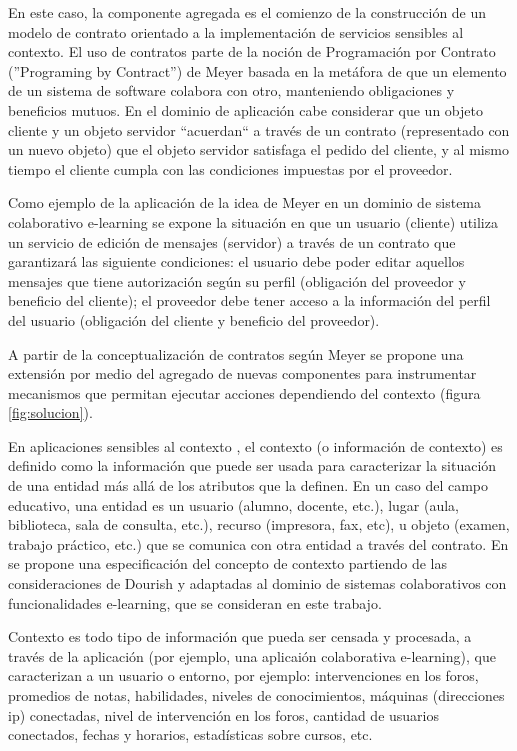 {En este caso, la componente agregada es el comienzo de la
construcción de un modelo de contrato orientado a la implementación de servicios
sensibles al contexto. El uso de contratos parte de la noción de Programación
por Contrato (”Programing by Contract”) de Meyer \cite{cap1.11} basada en la
metáfora de que un elemento de un sistema de software colabora con otro,
manteniendo obligaciones y beneficios mutuos. En el dominio de aplicación cabe
considerar que un objeto cliente y un objeto servidor “acuerdan“ a través de
un contrato (representado con un nuevo objeto) que el objeto servidor satisfaga
el pedido del cliente, y al mismo tiempo el cliente cumpla con las condiciones
impuestas por el proveedor.

Como ejemplo de la aplicación de la idea de Meyer en un dominio de
sistema colaborativo e-learning se expone la situación en que un
usuario (cliente) utiliza un servicio de edición de mensajes (servidor) a través
de un contrato que garantizará las siguiente condiciones: el usuario debe poder
editar aquellos mensajes que tiene autorización según su perfil (obligación del
proveedor y beneficio del cliente); el proveedor debe tener acceso a la
información del perfil del usuario (obligación del cliente y beneficio del
proveedor).

A partir de la conceptualización de contratos según Meyer se propone una
extensión por medio del agregado de nuevas componentes para instrumentar
mecanismos que permitan ejecutar acciones dependiendo del contexto (figura
\ref{fig:solucion}).

En aplicaciones sensibles al contexto \cite{cap1.6}, el contexto (o información
de contexto) es definido como la información que puede ser usada
para caracterizar la situación de una entidad más allá de los atributos que la
definen. En un caso del campo educativo, una entidad es un usuario (alumno, docente, etc.),
lugar (aula, biblioteca, sala de consulta, etc.), recurso (impresora, fax, etc),
u objeto (examen, trabajo práctico, etc.) que se comunica con otra entidad a
través del contrato. En \cite{cap1.2} se propone una especificación del concepto
de contexto partiendo de las consideraciones de Dourish \cite{cap1.20} y
adaptadas al dominio de sistemas colaborativos con funcionalidades e-learning,
que se consideran en este trabajo.

Contexto es todo tipo de información que pueda ser censada y procesada, a través
de la aplicación (por ejemplo, una aplicaión colaborativa e-learning), que
caracterizan a un usuario o entorno, por
ejemplo: intervenciones en los foros, promedios de notas, habilidades, niveles
de conocimientos, máquinas (direcciones ip) conectadas, nivel de intervención en
los foros, cantidad de usuarios conectados, fechas y horarios, estadísticas
sobre cursos, etc.

}

